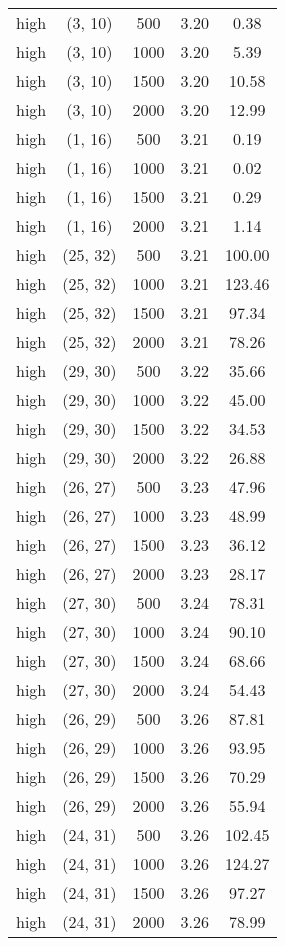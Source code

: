 \begin{tabular}{c c c c c}
high & (3, 10) &  500 & 3.20 & 0.38 \\
high & (3, 10) &  1000 & 3.20 & 5.39 \\
high & (3, 10) &  1500 & 3.20 & 10.58 \\
high & (3, 10) &  2000 & 3.20 & 12.99 \\
high & (1, 16) &  500 & 3.21 & 0.19 \\
high & (1, 16) &  1000 & 3.21 & 0.02 \\
high & (1, 16) &  1500 & 3.21 & 0.29 \\
high & (1, 16) &  2000 & 3.21 & 1.14 \\
high & (25, 32) &  500 & 3.21 & 100.00 \\
high & (25, 32) &  1000 & 3.21 & 123.46 \\
high & (25, 32) &  1500 & 3.21 & 97.34 \\
high & (25, 32) &  2000 & 3.21 & 78.26 \\
high & (29, 30) &  500 & 3.22 & 35.66 \\
high & (29, 30) &  1000 & 3.22 & 45.00 \\
high & (29, 30) &  1500 & 3.22 & 34.53 \\
high & (29, 30) &  2000 & 3.22 & 26.88 \\
high & (26, 27) &  500 & 3.23 & 47.96 \\
high & (26, 27) &  1000 & 3.23 & 48.99 \\
high & (26, 27) &  1500 & 3.23 & 36.12 \\
high & (26, 27) &  2000 & 3.23 & 28.17 \\
high & (27, 30) &  500 & 3.24 & 78.31 \\
high & (27, 30) &  1000 & 3.24 & 90.10 \\
high & (27, 30) &  1500 & 3.24 & 68.66 \\
high & (27, 30) &  2000 & 3.24 & 54.43 \\
high & (26, 29) &  500 & 3.26 & 87.81 \\
high & (26, 29) &  1000 & 3.26 & 93.95 \\
high & (26, 29) &  1500 & 3.26 & 70.29 \\
high & (26, 29) &  2000 & 3.26 & 55.94 \\
high & (24, 31) &  500 & 3.26 & 102.45 \\
high & (24, 31) &  1000 & 3.26 & 124.27 \\
high & (24, 31) &  1500 & 3.26 & 97.27 \\
high & (24, 31) &  2000 & 3.26 & 78.99 \\

\end{tabular}
